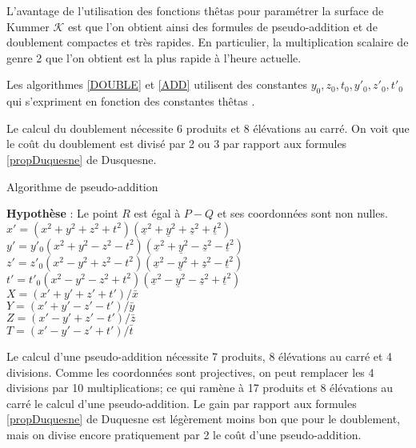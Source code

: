 \documentclass[a4paper,12pt]{article}
\theoremstyle{definition}
\theoremstyle{remark}
\numberwithin{equation}{section}
\begin{document}
L'avantage de l'utilisation des fonctions thêtas pour paramétrer la surface de Kummer $\mathcal{K}$ est que l'on obtient ainsi des formules de pseudo-addition et de doublement compactes et très rapides. En particulier, la multiplication scalaire de genre 2 que l'on obtient est la plus rapide à l'heure actuelle.

Les algorithmes \ref{DOUBLE} et \ref{ADD} utilisent des constantes $y_0,z_0,t_0,y'_0,z'_0,t'_0$ qui s'expriment en fonction des constantes thêtas \citep{gaudry}.

Le calcul du doublement nécessite 6 produits et 8 élévations au carré. On voit que le coût du doublement est divisé par 2 ou 3 par rapport aux formules \ref{propDuquesne} de Dusquesne.

\begin{algorithm}
\label{ADD}
\caption{Algorithme de pseudo-addition}
\textbf{Hypothèse} : Le point $R$ est égal à $P-Q$ et ses coordonnées sont non nulles. \\
$x' = (x^2 + y^2 + z^2 + t^2)(\underline{x}^2 + \underline{y}^2 + \underline{z}^2 + \underline{t}^2)$ \\
$y' = y'_0(x^2 + y^2 - z^2 - t^2)(\underline{x}^2 + \underline{y}^2 - \underline{z}^2 - \underline{t}^2)$ \\
$z' = z'_0(x^2 - y^2 + z^2 - t^2)(\underline{x}^2 - \underline{y}^2 + \underline{z}^2 - \underline{t}^2)$ \\
$t' = t'_0(x^2 - y^2 - z^2 + t^2)(\underline{x}^2 - \underline{y}^2 - \underline{z}^2 + \underline{t}^2)$ \\
$X = (x' + y' + z' + t')/\bar{x}$ \\
$Y = (x' + y' - z' - t')/\bar{y}$ \\
$Z = (x' - y' + z' - t')/\bar{z}$ \\
$T = (x' - y' - z' + t')/\bar{t}$ \\
\end{algorithm}

Le calcul d'une pseudo-addition nécessite 7 produits, 8 élévations au carré et 4 divisions. Comme les coordonnées sont projectives, on peut remplacer les 4 divisions par 10 multiplications; ce qui ramène à 17 produits et 8 élévations au carré le calcul d'une pseudo-addition. Le gain par rapport aux formules \ref{propDuquesne} de Duquesne est légèrement moins bon que pour le doublement, mais on divise encore pratiquement par 2 le coût d'une pseudo-addition.
\end{document}
